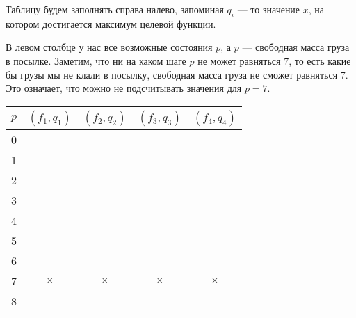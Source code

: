 Таблицу будем заполнять справа налево, запоминая $q_i$ --- то значение $x$, на котором достигается максимум целевой функции.

В левом столбце у нас все возможные состояния $p$, а $p$ --- свободная масса груза в посылке. Заметим, что ни на каком шаге $p$ не может равняться 7, то есть какие бы грузы мы не клали в посылку, свободная масса груза не сможет равняться 7. Это означает, что можно не подсчитывать значения для $p = 7$.

\begin{table}[H]
	\centering
	\begin{tabular}{ | c | c | c | c | c | } 
		\hline
		$p$ & $(f_1, q_1)$ & $(f_2, q_2)$ & $(f_3, q_3)$ & $(f_4, q_4)$ \\ 
		\hline
		0 & & & & \\\hline
		1 & & & & \\\hline
		2 & & & &\\\hline
		3 & & & & \\\hline
		4 & & & & \\\hline
		5 & & & & \\\hline
		6 & & & & \\\hline
		7 & $\times$ & $\times$ & $\times$ & $\times$ \\\hline
		8 & & & & \\\hline
	\end{tabular}
\end{table}

